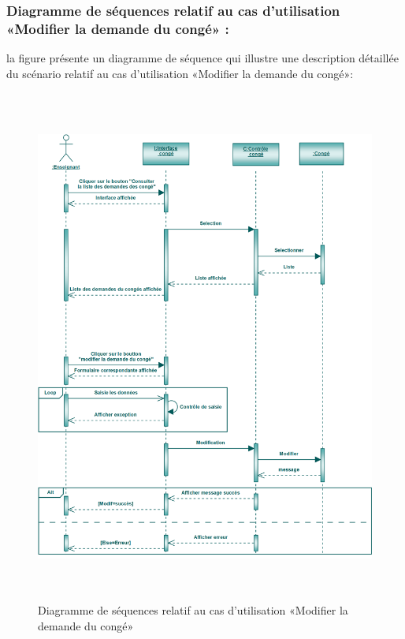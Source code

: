 \documentclass[12 pt ]{report}
\begin{document}
\subsubsection{Diagramme de séquences relatif au cas d’utilisation «Modifier la demande du congé» :}
la figure   présente un diagramme de séquence qui illustre une description détaillée du scénario relatif au cas d’utilisation «Modifier la demande du congé»: 
\begin{figure}[h]
 \begin{center}
\includegraphics[width= 18 cm ,height=  17cm]{smc.PNG}
\caption{Diagramme de séquences relatif au cas d’utilisation «Modifier la demande du congé»}

\end{center}
\end{figure}
\end{document}
